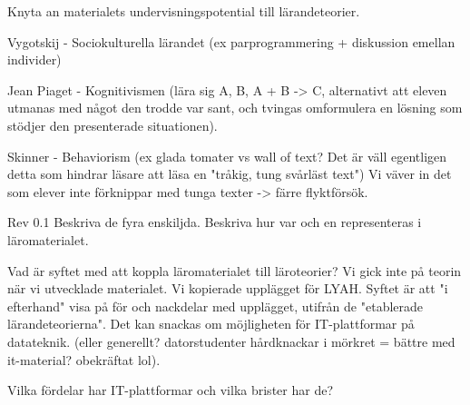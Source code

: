 \begin{binge}
Knyta an materialets undervisningspotential till lärandeteorier.

Vygotskij - Sociokulturella lärandet (ex parprogrammering + diskussion emellan individer)

Jean Piaget - Kognitivismen (lära sig A, B, A + B -> C, alternativt att eleven utmanas med något den trodde var sant, och tvingas omformulera en lösning som stödjer den presenterade situationen).

Skinner - Behaviorism (ex glada tomater vs wall of text? Det är väll egentligen detta som hindrar läsare att läsa en "tråkig, tung svårläst text")
Vi väver in det som elever inte förknippar med tunga texter -> färre flyktförsök.

Rev 0.1
Beskriva de fyra enskiljda.
Beskriva hur var och en representeras i läromaterialet.

Vad är syftet med att koppla läromaterialet till läroteorier?
    Vi gick inte på teorin när vi utvecklade materialet. Vi kopierade upplägget för LYAH. 
    Syftet är att "i efterhand" visa på för och nackdelar med upplägget, utifrån de "etablerade lärandeteorierna".
    Det kan snackas om möjligheten för IT-plattformar på datateknik. (eller generellt? datorstudenter hårdknackar i mörkret = bättre med it-material? obekräftat lol).

    Vilka fördelar har IT-plattformar och vilka brister har de?


\end{binge}
